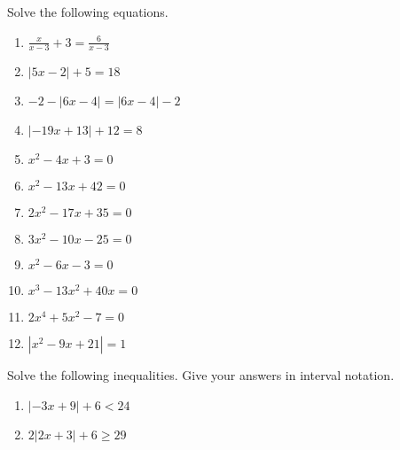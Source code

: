 \documentclass{article}
\begin{document}
\ReviewTitle[class={College Algebra}, for={Test 1}]

Solve the following equations.

\begin{enumerate}
\item $\displaystyle\frac{x}{x - 3} + 3 = \displaystyle\frac{6}{x - 3}$ \vspace{4cm}

\item $|5x - 2| + 5 = 18$ \vspace{4cm}

\item $-2 - |6x - 4| = |6x - 4| - 2$ \vspace{4cm}

\item $|-19x + 13| + 12 = 8$ \vspace{4cm}

\newpage

\item $x^2 - 4x + 3 = 0$

   \vspace{4cm}

\item $x^2 - 13x + 42 = 0$

   \vspace{4cm}

\item $2x^2 - 17x + 35 = 0$

   \vspace{4cm}

\item $3x^2 - 10x - 25 = 0$

   \vspace{4cm}

\item 

$x^2 - 6x - 3 = 0$

   \vspace{4cm}

\newpage

\item $x^3 - 13x^2 + 40x = 0$

   \vspace{4cm}

\item $2x^4 + 5x^2 - 7 = 0$

   \vspace{4cm}

\item $|x^2 - 9x + 21| = 1$

   \vspace{4cm}
\end{enumerate}

Solve the following inequalities. Give your answers in interval notation.

\begin{enumerate}
\item $|-3x + 9| + 6 < 24$ \vspace{4cm}

\item $2|2x + 3| + 6 \geq 29$
\end{enumerate}
\end{document}
